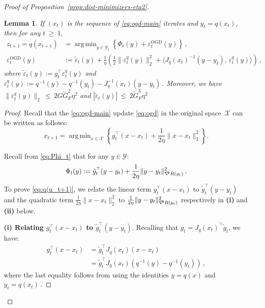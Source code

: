 \documentclass[a4paper,11pt,fullpage]{article}
\def\X{{\mathcal X}}
\def\Y{{\mathcal Y}}
\theoremstyle{plain}
\newtheorem{lemma}{Lemma}
\theoremstyle{definition}
\theoremstyle{plain}
\DeclareMathOperator*{\argmin}{arg\,min}
\renewcommand{\leq}{~\le~}
\renewcommand{\geq}{~\ge~}
\let\nablaold\nabla
\renewcommand{\nabla}{\nablaold\mkern-2.5mu}
\begin{document}
\begin{proof}[Proof of Proposition~\ref{prop:dist-minimizers-eta2}]
\begin{tcolorbox}[colframe=white!, top=2pt,left=2pt,right=2pt,bottom=2pt] 
\begin{lemma}
\label{lem:ogd-rewritten}
If $(x_t)$ is the sequence of \eqref{eq:ogd-main} iterates and $y_t = q(x_t)$, then for any $t \geq 1,$
\begin{align}
\label{eq:q(u_t+1)}
z_{t+1} = q(x_{t+1}) &=\argmin_{y\in \Y_t} \left\{ \Phi_t(y) + \varepsilon_t^{\mathrm{OGD}}(y) \right\}\,,\\
\varepsilon_t^{\mathrm{OGD}}(y) &:= \tilde\varepsilon_t(y)
+ \frac{1}{\eta} \left(\frac12\|\varepsilon_t^q(y)\|_2^2 + \big\langle J_q(x_t)^{-1}(y-y_t),\,\varepsilon_t^q(y)\big\rangle
\right)\,,
\end{align}
where $\tilde\varepsilon_t(y) := g_t^\top\varepsilon_t^q(y)$ and $\varepsilon_t^q(y) := q^{-1}(y)-q^{-1}(y_t)- J_q^{-1}(x_t)(y-y_t)\,.$ Moreover, we have $\|\varepsilon_t^q(y)\|_2 \leq 2 G \tilde{G}_F^2 \eta^2$ and 
$|\tilde\varepsilon_t(y)| \leq 2 \tilde{G}_F^3 \eta^2$
\end{lemma}
\end{tcolorbox}

\begin{proof}
Recall that the \eqref{eq:ogd-main} update \eqref{eq:ogd} in the original space~$\X$ can be written as follows: 
\begin{equation}
\label{eq:update-rule-OGD}
x_{t+1}
=
\argmin_{x\in \X}
\left\{
g_t^\top(x-x_t)+\frac{1}{2\eta}\|x-x_t\|_2^2
\right\}.
\end{equation}

Recall from \eqref{eq:Phi_t} that for any $y \in \Y$: 
\begin{equation*}
\Phi_t(y) := \tilde{g}_t^{\top}(y - y_t) + \frac{1}{2\eta} \|y-y_t\|_{\nabla^2 R(y_t)}^2\,.
\end{equation*}
To prove \eqref{eq:q(u_t+1)}, we relate the linear term $g_t^\top (x-x_t)$ to $\tilde{g}_t^\top(y-y_t)$ and the quadratic term $\frac{1}{2\eta}\|x-x_t\|_2^2$ to $\frac{1}{2\eta} \|y-y_t\|_{\nabla^2 R(y_t)}^2$ respectively in \textbf{(i)} and \textbf{(ii)} below. 

\noindent\textbf{(i) Relating $g_t^\top (x-x_t)$ to $ \tilde{g}_t^\top(y-y_t).$}
Recalling that $g_t = J_q(x_t)^{\top} \tilde{g}_t$, we have:  
\begin{align}
\label{eq:inner-prod-tilde-f}
g_t^\top (x-x_t)
&= \tilde{g}_t^\top J_q(x_t)(x-x_t) \nonumber\\
&= \tilde{g}_t^\top J_q(x_t)(q^{-1}(y) - q^{-1}(y_t))\,,
\end{align}
where the last equality follows from using the identities $y = q(x)$ and $y_t = q(x_t)\,.$ 


\end{proof}
\end{proof}
\end{document}
